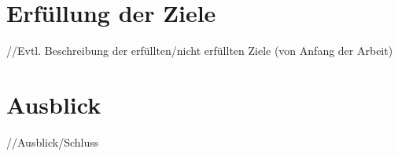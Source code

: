 \chapter{Erfüllung der Ziele}

//Evtl. Beschreibung der erfüllten/nicht erfüllten Ziele (von Anfang der Arbeit) 


\chapter{Ausblick}

//Ausblick/Schluss